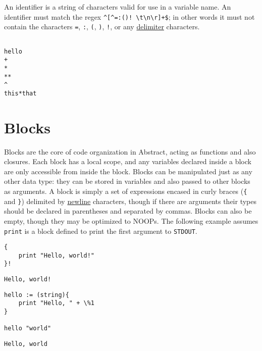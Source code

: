 \documentclass[letterpaper,titlepage]{scrreprt}
\begin{document}
An identifier is a string of characters valid for use in a variable name. An identifier must match the regex \lstinline{^[^=:()! \t\n\r]+$}; in other words it must not contain the characters \lstinline{=}, \lstinline{:}, \lstinline{(}, \lstinline{)}, \lstinline{!}, or any \hyperref[def:delimiter]{delimiter} characters.

\begin{lstlisting}[caption={Example identifiers},label=lst:identifiers]

hello
+
*
**
^
this*that

\end{lstlisting}

\section{Blocks}
\label{sec:Blocks}

Blocks are the core of code organization in Abstract, acting as functions and also closures. Each block has a local scope, and any variables declared inside a block are only accessible from inside the block. Blocks can be manipulated just as any other data type: they can be stored in variables and also passed to other blocks as arguments. A block is simply a set of expressions encased in curly braces (\lstinline|{| and \lstinline|}|) delimited by \hyperref[def:newline]{newline} characters, though if there are arguments their types should be declared in parentheses and separated by commas. Blocks can also be empty, though they may be optimized to NOOPs. The following example assumes \lstinline{print} is a block defined to print the first argument to \lstinline{STDOUT}.

\begin{lstlisting}[caption={Example block},label=lst:exampleblock]
{
	print "Hello, world!"
}!
\end{lstlisting}
\begin{lstlisting}[caption={Example block output},label=lst:exampleblockoutput]
Hello, world!
\end{lstlisting}

\begin{lstlisting}[caption={Example block with arguments},label=lst:exampleblockarg]
hello := (string){
	print "Hello, " + \%1
}

hello "world"
\end{lstlisting}
\begin{lstlisting}[caption={Example block with arguments output},label=lst:exampleblockargoutput]
Hello, world
\end{lstlisting}
\end{document}
